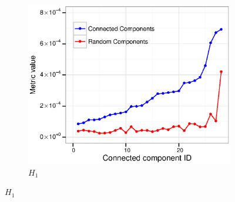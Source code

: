 \begin{figure}
\begin{subfigure}[b]{0.3\textwidth}
    \includegraphics[width=\textwidth]{figures_supp/Plots_from_data/cc_validation/H1.eps}
    \caption{$H_1$} \label{fig:H1}
  \end{subfigure}


\end{figure}
